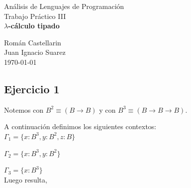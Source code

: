 \documentclass[12pt]{article}
\begin{document}
\begin{titlepage}
\vspace{0.5cm}

\begin{center}
\normalsize{\sc Análisis de Lenguajes de Programación}\\
\vspace{0.5cm}
\large{Trabajo Práctico III}\\

\Large{\bf $\lambda$-cálculo tipado}\\
\vspace{5cm}

\normalsize
Román Castellarin\\
Juan Ignacio Suarez\\

\vspace*{0.5cm}
\small{ \today }


\end{center}
\end{titlepage}
\newpage

\subsection{Ejercicio 1}

Notemos con $B^2 \equiv (B \rightarrow B)$ y con $B^3 \equiv (B \rightarrow B \rightarrow B)$.

A continuación definimos los siguientes contextos:\\


$\Gamma_1 = \lbrace x:B^3, y:B^2, z:B \rbrace$

$\Gamma_2 = \lbrace x:B^3, y:B^2 \rbrace$

$\Gamma_3 = \lbrace x:B^3 \rbrace$\\


Luego resulta,\\

\end{document}
